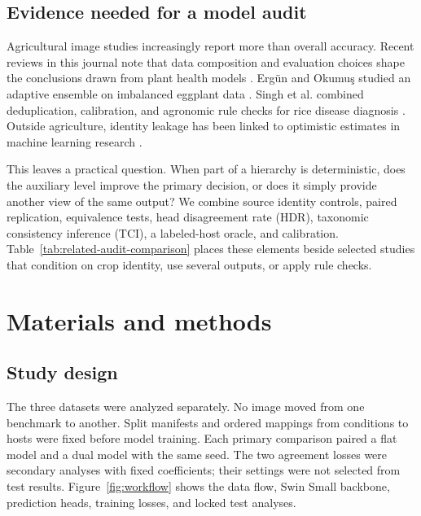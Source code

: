 \documentclass[preprint,12pt]{elsarticle}
\begin{document}
\subsection{Evidence needed for a model audit}

Agricultural image studies increasingly report more than overall accuracy.
Recent reviews in this journal note that data composition and evaluation choices
shape the conclusions drawn from plant health models \cite{ngugi2021,elhanafy2026}.
Erg\"un and Okumu\c{s} studied an adaptive ensemble on imbalanced eggplant data
\cite{ergun2026}. Singh et al. combined deduplication, calibration, and
agronomic rule checks for rice disease diagnosis \cite{singh2026}. Outside
agriculture, identity leakage has been linked to optimistic estimates in
machine learning research \cite{kapoor2023}.

This leaves a practical question. When part of a hierarchy is deterministic,
does the auxiliary level improve the primary decision, or does it simply
provide another view of the same output? We combine source identity controls,
paired replication, equivalence tests, head disagreement rate (HDR), taxonomic
consistency inference (TCI), a labeled-host oracle, and calibration.
Table~\ref{tab:related-audit-comparison} places these elements beside selected
studies that condition on crop identity, use several outputs, or apply rule
checks.



\section{Materials and methods}
\label{sec:methods}

\subsection{Study design}
\label{sec:design}

The three datasets were analyzed separately. No image moved from one benchmark
to another. Split manifests and ordered mappings from conditions to hosts were
fixed before model training. Each primary comparison paired a flat model and a
dual model with the same seed. The two agreement losses were secondary analyses
with fixed coefficients; their settings were not selected from test results.
Figure~\ref{fig:workflow} shows the data flow, Swin Small backbone, prediction
heads, training losses, and locked test analyses.
\end{document}
